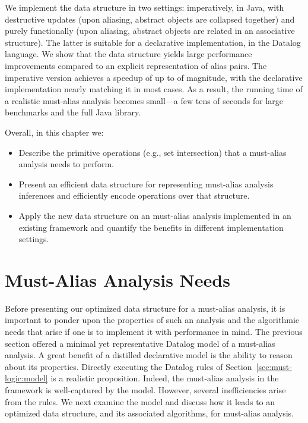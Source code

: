 We implement the data structure in two settings: imperatively, in Java, with destructive updates (upon aliasing, abstract objects are collapsed together) and purely functionally (upon aliasing, abstract objects are related in an associative structure). The latter is suitable for a declarative implementation, in the Datalog language. We show that the data structure yields large performance improvements compared to an explicit representation of alias pairs. The imperative version achieves a speedup of up to  of magnitude, with the declarative implementation nearly matching it in most cases. As a result, the running time of a realistic must-alias analysis becomes small---a few tens of seconds for large benchmarks and the full Java library.

Overall, in this chapter we:

\begin{itemize}
\item Describe the primitive operations (e.g., set intersection) that a must-alias analysis needs to perform.
\item Present an efficient data structure for representing must-alias analysis inferences and efficiently encode operations over that structure.
\item Apply the new data structure on an must-alias analysis implemented in an existing framework and quantify the benefits in different implementation settings.
\end{itemize}


\section{Must-Alias Analysis Needs}
\label{sec:must-data:needs}

Before presenting our optimized data structure for a must-alias analysis, it is important to ponder upon the properties of such an analysis and the algorithmic needs that arise if one is to implement it with performance in mind. The previous section offered a minimal yet representative Datalog model of a must-alias analysis. A great benefit of a distilled declarative model is the ability to reason about its properties. Directly executing the Datalog rules of Section~\ref{sec:must-logic:model} is a realistic proposition. Indeed, the must-alias analysis in the \doop{} framework is well-captured by the model. However, several inefficiencies arise from the rules. We next examine the model and discuss how it leads to an optimized data structure, and its associated algorithms, for must-alias analysis.


